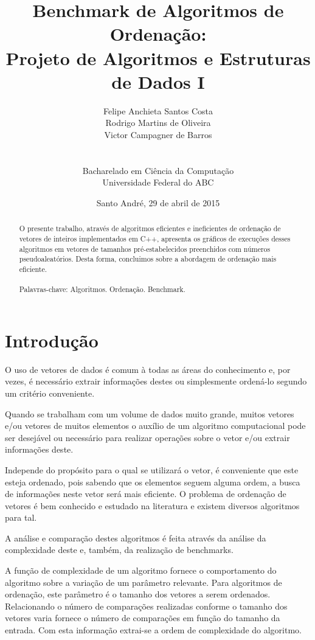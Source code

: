 \documentclass[11pt, brazil, a4paper, usenames, svgnames, dvipsnames]{article}
\title{Benchmark de Algoritmos de Ordenação:\\Projeto de Algoritmos e Estruturas de Dados I}
\author{Felipe Anchieta Santos Costa \\ Rodrigo Martins de Oliveira\\ Victor Campagner de Barros\\\\ \\ {Bacharelado em Ciência da Computação}\\ {Universidade Federal do ABC}\\ }
\date{Santo André, 29 de abril de 2015}
\begin{document}
\maketitle

\begin{abstract}
\parindent=3cm
O presente trabalho, através de algoritmos eficientes e ineficientes de ordenação de vetores de inteiros implementados em C++, apresenta os gráficos de execuções desses algoritmos em vetores de tamanhos pré-estabelecidos preenchidos com números pseudoaleatórios. Desta forma, concluimos sobre a abordagem de ordenação mais eficiente.
\\
\\
\noindent
Palavras-chave: Algoritmos. Ordenação. Benchmark.
\end{abstract}

\newpage

\noindent
\section{Introdução}
\label{sec:introducao}
\hfill

O uso de vetores de dados é comum à todas as áreas do conhecimento e, por vezes,
é necessário extrair informações destes ou simplesmente ordená-lo segundo um
critério conveniente.

Quando se trabalham com um volume de dados muito grande,
muitos vetores e/ou vetores de muitos elementos o auxílio de um algoritmo
computacional pode ser desejável ou necessário para realizar operações sobre
o vetor e/ou extrair informações deste.

Independe do propósito para o qual se
utilizará o vetor, é conveniente que este esteja ordenado, pois sabendo que
os elementos seguem alguma ordem, a busca de informações neste vetor será mais
eficiente. O problema de ordenação de vetores é bem conhecido e estudado na literatura e
existem diversos algoritmos para tal.

A análise e comparação destes algoritmos é feita através da análise da complexidade
deste e, também, da realização de benchmarks.

A função de complexidade de um algoritmo fornece o comportamento do algoritmo sobre
a variação de um parâmetro relevante. Para algoritmos de ordenação, este parâmetro é
o tamanho dos vetores a serem ordenados. Relacionando o número de comparações realizadas
conforme o tamanho dos vetores varia fornece o número de comparações em função do tamanho
da entrada. Com esta informação extrai-se a ordem de complexidade do algoritmo. 
\end{document}
